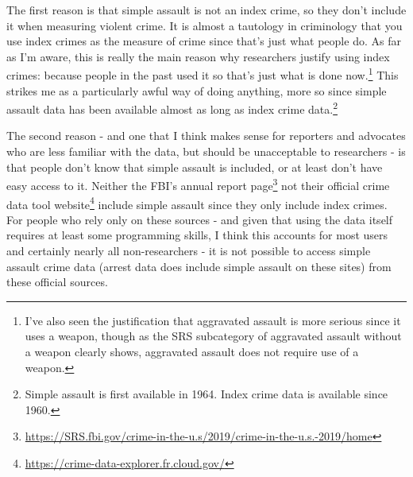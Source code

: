 \documentclass[
]{krantz}
\renewcommand{\href}[2]{#2\footnote{\url{#1}}}
\begin{document}
The first reason is that simple assault is not an index
crime, so they don't include it when measuring violent
crime. It is almost a tautology in criminology that you use
index crimes as the measure of crime since that's just what
people do. As far as I'm aware, this is really the main
reason why researchers justify using index crimes: because
people in the past used it so that's just what is done
now.\footnote{I've also seen the justification that
  aggravated assault is more serious since it uses a weapon,
  though as the SRS subcategory of aggravated assault
  without a weapon clearly shows, aggravated assault does
  not require use of a weapon.} This strikes me as a
particularly awful way of doing anything, more so since
simple assault data has been available almost as long as
index crime data.\footnote{Simple assault is first available
  in 1964. Index crime data is available since 1960.}

The second reason - and one that I think makes sense for
reporters and advocates who are less familiar with the data,
but should be unacceptable to researchers - is that people
don't know that simple assault is included, or at least
don't have easy access to it. Neither the FBI's annual
report
\href{https://SRS.fbi.gov/crime-in-the-u.s/2019/crime-in-the-u.s.-2019/home}{page}
not their official
\href{https://crime-data-explorer.fr.cloud.gov/}{crime data
tool website} include simple assault since they only include
index crimes. For people who rely only on these sources -
and given that using the data itself requires at least some
programming skills, I think this accounts for most users and
certainly nearly all non-researchers - it is not possible to
access simple assault crime data (arrest data does include
simple assault on these sites) from these official sources.
\end{document}
